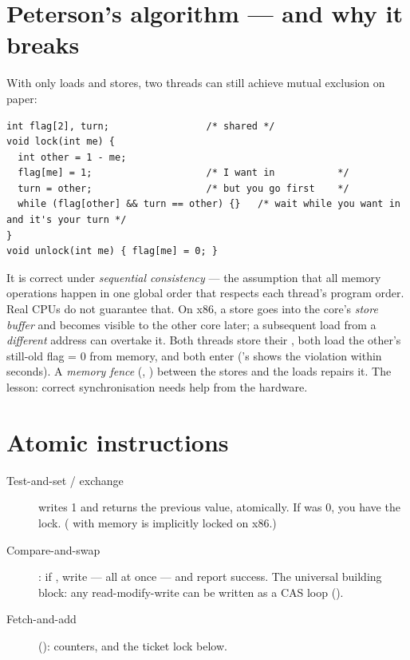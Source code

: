 \section{Peterson's algorithm --- and why it breaks}

With only loads and stores, two threads can still achieve mutual
exclusion on paper:

\begin{lstlisting}
int flag[2], turn;                 /* shared */
void lock(int me) {
  int other = 1 - me;
  flag[me] = 1;                    /* I want in           */
  turn = other;                    /* but you go first    */
  while (flag[other] && turn == other) {}   /* wait while you want in and it's your turn */
}
void unlock(int me) { flag[me] = 0; }
\end{lstlisting}

It is correct under \emph{sequential consistency} --- the assumption that
all memory operations happen in one global order that respects each
thread's program order. Real CPUs do not guarantee that. On x86, a store
goes into the core's \emph{store buffer} and becomes visible to the other
core later; a subsequent load from a \emph{different} address can
overtake it. Both threads store their , both load the other's
still-old flag = 0 from memory, and both enter ('s
 shows the violation within seconds). A \emph{memory
fence} (, )
between the stores and the loads repairs it. The lesson: correct
synchronisation needs help from the hardware.

\section{Atomic instructions}

\begin{description}
  \item[Test-and-set / exchange]  writes 1 and
    returns the previous value, atomically. If  was 0, you have
    the lock. ( with memory is implicitly locked on x86.)
  \item[Compare-and-swap] : if , write  --- all at once --- and report success.
    The universal building block: any read-modify-write can be written as
    a CAS loop ().
  \item[Fetch-and-add]  ():
    counters, and the ticket lock below.
\end{description}

